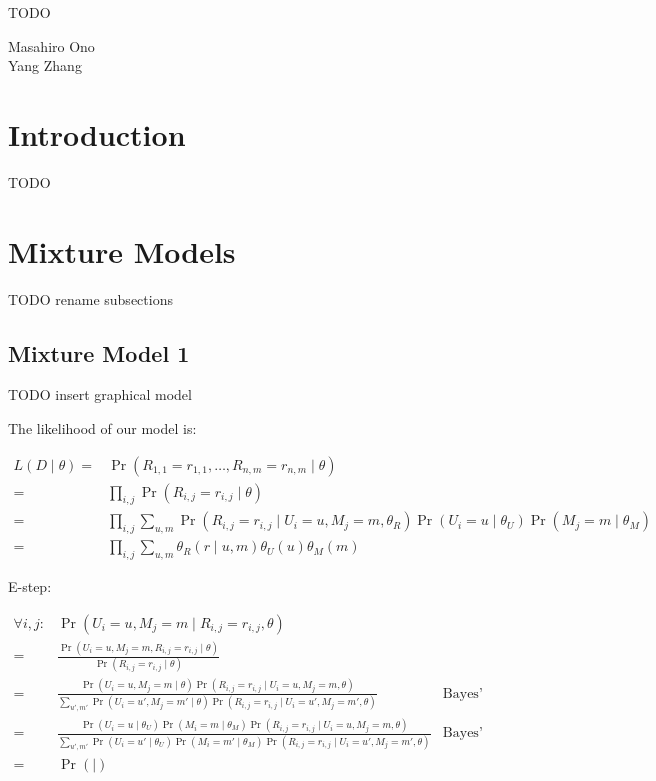 \documentclass{article}
\newcommand{\PO}[1]{{ \Pr \left( #1 \right) }}
\newcommand{\PP}[2]{{ \PO{ #1 \mid #2 } }}
\begin{document}
TODO

Masahiro Ono \\
Yang  Zhang

\section{Introduction}

TODO

\section{Mixture Models}

TODO rename subsections

\subsection{Mixture Model 1}

TODO insert graphical model

The likelihood of our model is:

\begin{align*}
  L \left( D \mid \theta \right)
  =& \PP{ R_{1,1} = r_{1,1}, \dots, R_{n,m} = r_{n,m} }{ \theta } \\
  =& \prod_{i,j} \PP{ R_{i,j} = r_{i,j} }{ \theta } \\
  =& \prod_{i,j} \sum_{u,m}
  \PP{ R_{i,j} = r_{i,j} }{ U_i = u, M_j = m, \theta_R }
  \PP{ U_i = u }{ \theta_U }
  \PP{ M_j = m }{ \theta_M } \\
  =& \prod_{i,j} \sum_{u,m} \theta_R(r \mid u,m) \theta_U(u) \theta_M(m)
\end{align*}

E-step:

\begin{align*}
  \forall i,j:
  & \PP{ U_i = u, M_j = m }{ R_{i,j} = r_{i,j}, \theta } \\
  =& \frac{
    \PP{ U_i = u, M_j = m, R_{i,j} = r_{i,j} }{ \theta }
  }{
    \PP{ R_{i,j} = r_{i,j} }{ \theta }
  } \\
  =& \frac{
    \PP{ U_i = u, M_j = m }{ \theta }
    \PP{ R_{i,j} = r_{i,j} }{ U_i = u, M_j = m, \theta }
  }{
    \sum_{u',m'}
    \PP{ U_i = u', M_j = m' }{ \theta }
    \PP{ R_{i,j} = r_{i,j} }{ U_i = u', M_j = m', \theta }
  } & \textrm{Bayes' rule} \\
  =& \frac{
    \PP{ U_i = u }{ \theta_U }
    \PP{ M_i = m }{ \theta_M }
    \PP{ R_{i,j} = r_{i,j} }{ U_i = u, M_j = m, \theta }
  }{
    \sum_{u',m'}
    \PP{ U_i = u' }{ \theta_U }
    \PP{ M_i = m' }{ \theta_M }
    \PP{ R_{i,j} = r_{i,j} }{ U_i = u', M_j = m', \theta }
  } & \textrm{Bayes' rule} \\
  =& \PP{}{}
\end{align*}
\end{document}
